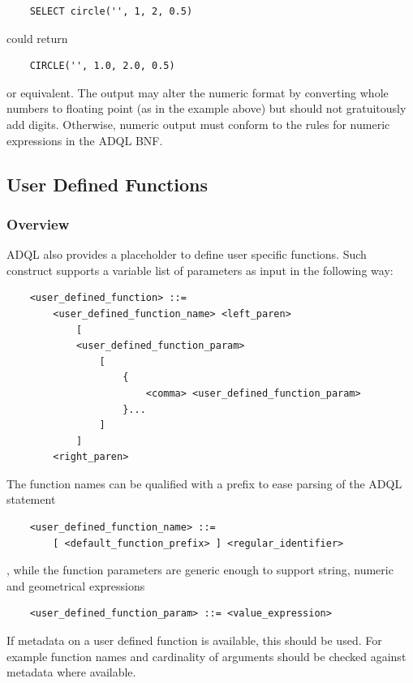\documentclass[11pt,a4paper]{ivoa}
\begin{document}
\begin{verbatim}
    SELECT circle('', 1, 2, 0.5)
\end{verbatim}

could return

\begin{verbatim}
    CIRCLE('', 1.0, 2.0, 0.5)
\end{verbatim}

or equivalent.
The output may alter the numeric format by converting whole numbers to
floating point (as in the example above) but should not gratuitously add
digits. Otherwise, numeric output must conform to the rules for numeric
expressions in the ADQL BNF.

\subsection{User Defined Functions}
\label{sec:user.functions}
\subsubsection{Overview}

ADQL also provides a placeholder to define user specific functions. Such
construct supports a variable list of parameters as input in the following way:

\begin{verbatim}
    <user_defined_function> ::=
        <user_defined_function_name> <left_paren>
            [
            <user_defined_function_param>
                [
                    {
                        <comma> <user_defined_function_param>
                    }...
                ]
            ]
        <right_paren>
\end{verbatim}

The function names can be qualified with a prefix to ease parsing of the
ADQL statement

\begin{verbatim}
    <user_defined_function_name> ::=
        [ <default_function_prefix> ] <regular_identifier>
\end{verbatim}

, while the function parameters are generic enough to support string,
numeric and geometrical expressions

\begin{verbatim}
    <user_defined_function_param> ::= <value_expression>
\end{verbatim}

If metadata on a user defined function is available, this should be used. For
example function names and cardinality of arguments should be checked against
metadata where available.
\end{document}
